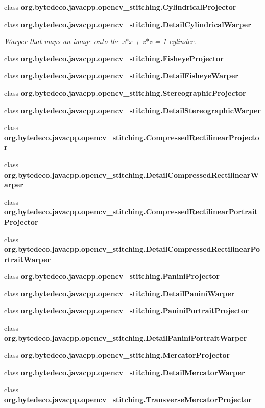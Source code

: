 \begin{DoxyCompactItemize}
class {\bfseries org.\+bytedeco.\+javacpp.\+opencv\+\_\+stitching.\+Cylindrical\+Projector}
\item 
class {\bfseries org.\+bytedeco.\+javacpp.\+opencv\+\_\+stitching.\+Detail\+Cylindrical\+Warper}
\begin{DoxyCompactList}\small\item\em Warper that maps an image onto the x$\ast$x + z$\ast$z = 1 cylinder. \end{DoxyCompactList}\item 
class {\bfseries org.\+bytedeco.\+javacpp.\+opencv\+\_\+stitching.\+Fisheye\+Projector}
\item 
class {\bfseries org.\+bytedeco.\+javacpp.\+opencv\+\_\+stitching.\+Detail\+Fisheye\+Warper}
\item 
class {\bfseries org.\+bytedeco.\+javacpp.\+opencv\+\_\+stitching.\+Stereographic\+Projector}
\item 
class {\bfseries org.\+bytedeco.\+javacpp.\+opencv\+\_\+stitching.\+Detail\+Stereographic\+Warper}
\item 
class {\bfseries org.\+bytedeco.\+javacpp.\+opencv\+\_\+stitching.\+Compressed\+Rectilinear\+Projector}
\item 
class {\bfseries org.\+bytedeco.\+javacpp.\+opencv\+\_\+stitching.\+Detail\+Compressed\+Rectilinear\+Warper}
\item 
class {\bfseries org.\+bytedeco.\+javacpp.\+opencv\+\_\+stitching.\+Compressed\+Rectilinear\+Portrait\+Projector}
\item 
class {\bfseries org.\+bytedeco.\+javacpp.\+opencv\+\_\+stitching.\+Detail\+Compressed\+Rectilinear\+Portrait\+Warper}
\item 
class {\bfseries org.\+bytedeco.\+javacpp.\+opencv\+\_\+stitching.\+Panini\+Projector}
\item 
class {\bfseries org.\+bytedeco.\+javacpp.\+opencv\+\_\+stitching.\+Detail\+Panini\+Warper}
\item 
class {\bfseries org.\+bytedeco.\+javacpp.\+opencv\+\_\+stitching.\+Panini\+Portrait\+Projector}
\item 
class {\bfseries org.\+bytedeco.\+javacpp.\+opencv\+\_\+stitching.\+Detail\+Panini\+Portrait\+Warper}
\item 
class {\bfseries org.\+bytedeco.\+javacpp.\+opencv\+\_\+stitching.\+Mercator\+Projector}
\item 
class {\bfseries org.\+bytedeco.\+javacpp.\+opencv\+\_\+stitching.\+Detail\+Mercator\+Warper}
\item 
class {\bfseries org.\+bytedeco.\+javacpp.\+opencv\+\_\+stitching.\+Transverse\+Mercator\+Projector}

\end{DoxyCompactItemize}
